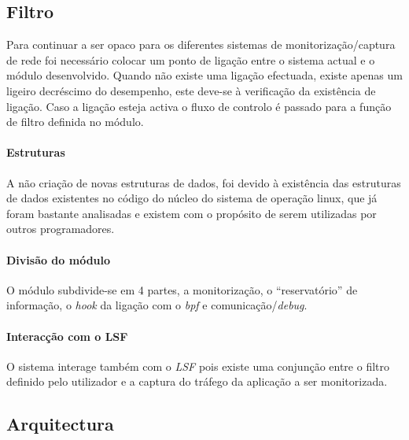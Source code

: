 \subsection{Filtro}

Para continuar a ser opaco para os diferentes sistemas de monitorização/captura de rede foi necessário colocar um ponto de ligação entre o sistema actual e o módulo desenvolvido. Quando não existe uma ligação efectuada, existe apenas um ligeiro decréscimo do desempenho, este deve-se à verificação da existência de ligação. Caso a ligação esteja activa o fluxo de controlo é passado para a função de filtro definida no módulo.


\paragraph{Estruturas}

A não criação de novas estruturas de dados, foi devido à existência das
estruturas de dados existentes no código do núcleo do sistema de operação
linux, que já foram bastante analisadas e existem com o propósito de serem
utilizadas por outros programadores.

\paragraph{Divisão do módulo} 

O módulo subdivide-se em 4 partes, a monitorização, o ``reservatório'' de
informação, o \textit{hook} da ligação com o \textit{bpf} e
comunicação/\textit{debug}.

\paragraph{Interacção com o LSF}
O sistema interage também com o \textit{LSF} pois existe uma conjunção
entre o filtro definido pelo utilizador e a captura do tráfego da aplicação a
ser monitorizada.

\subsection{Arquitectura}

